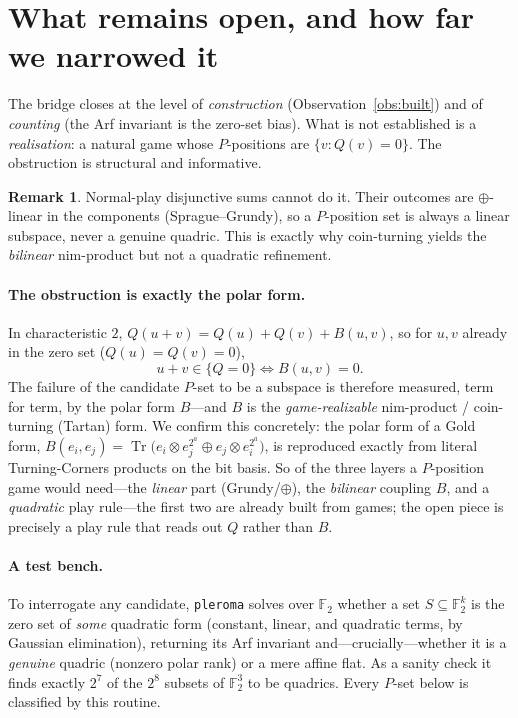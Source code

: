 \documentclass[11pt]{article}
\theoremstyle{definition}
\newtheorem{remark}{Remark}
\newcommand{\F}{\mathbb{F}}
\newcommand{\Tr}{\operatorname{Tr}}
\newcommand{\nimmul}{\otimes}
\begin{document}
\section{What remains open, and how far we narrowed it}

The bridge closes at the level of \emph{construction} (Observation~\ref{obs:built})
and of \emph{counting} (the Arf invariant is the zero-set bias). What is not
established is a \emph{realisation}: a natural game whose $P$-positions are
$\{v:Q(v)=0\}$. The obstruction is structural and informative.

\begin{remark}\label{rem:linear}
Normal-play disjunctive sums cannot do it. Their outcomes are $\oplus$-linear in
the components (Sprague--Grundy), so a $P$-position set is always a linear
subspace, never a genuine quadric. This is exactly why coin-turning yields the
\emph{bilinear} nim-product but not a quadratic refinement.
\end{remark}

\paragraph{The obstruction is exactly the polar form.}
In characteristic $2$, $Q(u+v)=Q(u)+Q(v)+B(u,v)$, so for $u,v$ already in the
zero set ($Q(u)=Q(v)=0$),
\[
  u+v \in \{Q=0\} \iff B(u,v)=0.
\]
The failure of the candidate $P$-set to be a subspace is therefore measured,
term for term, by the polar form $B$---and $B$ is the \emph{game-realizable}
nim-product / coin-turning (Tartan) form. We confirm this concretely: the polar
form of a Gold form, $B(e_i,e_j)=\Tr\!\bigl(e_i\nimmul e_j^{2^a}\oplus e_j\nimmul
e_i^{2^a}\bigr)$, is reproduced exactly from literal Turning-Corners products on
the bit basis. So of the three layers a $P$-position game would need---the
\emph{linear} part (Grundy/$\oplus$), the \emph{bilinear} coupling $B$, and a
\emph{quadratic} play rule---the first two are already built from games; the open
piece is precisely a play rule that reads out $Q$ rather than $B$.

\paragraph{A test bench.}
To interrogate any candidate, \texttt{pleroma} solves over $\F_2$ whether a set
$S\subseteq\F_2^k$ is the zero set of \emph{some} quadratic form (constant,
linear, and quadratic terms, by Gaussian elimination), returning its Arf
invariant and---crucially---whether it is a \emph{genuine} quadric (nonzero polar
rank) or a mere affine flat. As a sanity check it finds exactly $2^7$ of the
$2^8$ subsets of $\F_2^3$ to be quadrics. Every $P$-set below is classified by
this routine.
\end{document}

